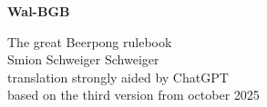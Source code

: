 \documentclass[a5paper, 12pt]{book}
\begin{document}
\renewcommand{\listfigurename}{Abbildungs- verzeichnis}
\begin{titlepage}
\begin{center}
{\fontsize{40}{48}\selectfont \textbf{Wal-BGB}\par}

\begin{large}
\vspace{0.3cm}
The great Beerpong rulebook\\
\vspace{1cm}
Smion Schweiger Schweiger\\
translation strongly aided by ChatGPT\\
\vspace{1cm}
based on the third version from october 2025
\end{large}
\end{center}
\vspace{6cm}

\end{titlepage}
\end{document}
